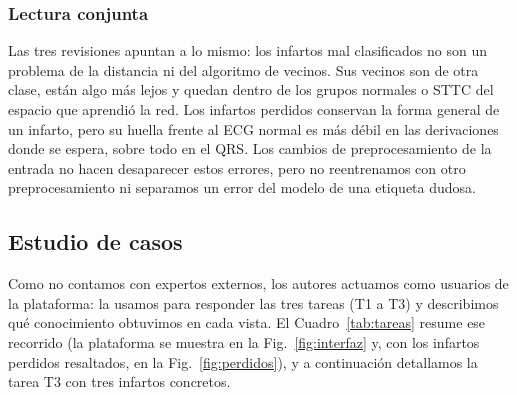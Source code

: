 \documentclass[conference]{IEEEtran}
\begin{document}
\subsubsection{Lectura conjunta}
Las tres revisiones apuntan a lo mismo: los infartos mal clasificados no son un problema de la distancia ni del algoritmo de vecinos. Sus vecinos son de otra clase, están algo más lejos y quedan dentro de los grupos normales o STTC del espacio que aprendió la red. Los infartos perdidos conservan la forma general de un infarto, pero su huella frente al ECG normal es más débil en las derivaciones donde se espera, sobre todo en el QRS. Los cambios de preprocesamiento de la entrada no hacen desaparecer estos errores, pero no reentrenamos con otro preprocesamiento ni separamos un error del modelo de una etiqueta dudosa.

\subsection{Estudio de casos}
Como no contamos con expertos externos, los autores actuamos como usuarios de la plataforma: la usamos para responder las tres tareas (T1 a T3) y describimos qué conocimiento obtuvimos en cada vista. El Cuadro~\ref{tab:tareas} resume ese recorrido (la plataforma se muestra en la Fig.~\ref{fig:interfaz} y, con los infartos perdidos resaltados, en la Fig.~\ref{fig:perdidos}), y a continuación detallamos la tarea T3 con tres infartos concretos.
\end{document}
